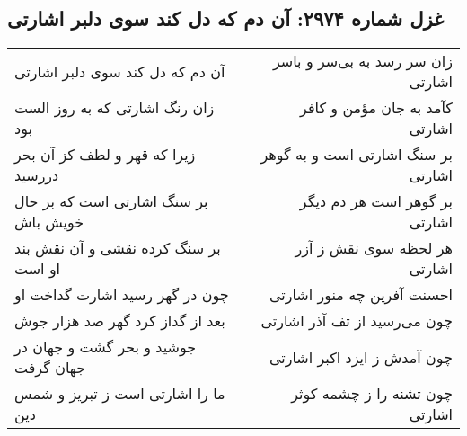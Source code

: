 \begin{center}
\section*{غزل شماره ۲۹۷۴: آن دم که دل کند سوی دلبر اشارتی}
\label{sec:2974}
\begin{longtable}{l p{0.5cm} r}
آن دم که دل کند سوی دلبر اشارتی
&&
زان سر رسد به بی‌سر و باسر اشارتی
\\
زان رنگ اشارتی که به روز الست بود
&&
کآمد به جان مؤمن و کافر اشارتی
\\
زیرا که قهر و لطف کز آن بحر دررسید
&&
بر سنگ اشارتی است و به گوهر اشارتی
\\
بر سنگ اشارتی است که بر حال خویش باش
&&
بر گوهر است هر دم دیگر اشارتی
\\
بر سنگ کرده نقشی و آن نقش بند او است
&&
هر لحظه سوی نقش ز آزر اشارتی
\\
چون در گهر رسید اشارت گداخت او
&&
احسنت آفرین چه منور اشارتی
\\
بعد از گداز کرد گهر صد هزار جوش
&&
چون می‌رسید از تف آذر اشارتی
\\
جوشید و بحر گشت و جهان در جهان گرفت
&&
چون آمدش ز ایزد اکبر اشارتی
\\
ما را اشارتی است ز تبریز و شمس دین
&&
چون تشنه را ز چشمه کوثر اشارتی
\\
\end{longtable}
\end{center}
